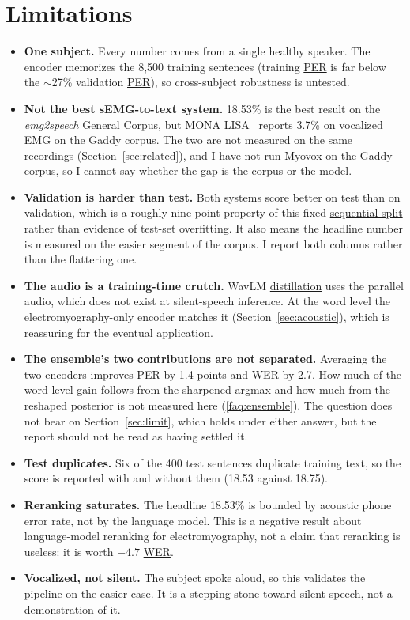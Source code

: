 \documentclass{article}
\DeclareRobustCommand{\glref}[2]{\hyperlink{gl:#1}{\textcolor{glosslink}{#2}}}
\DeclareRobustCommand{\wer}{\glref{wer}{WER}}
\DeclareRobustCommand{\per}{\glref{per}{PER}}
\begin{document}
\section{Limitations}

\begin{itemize}[itemsep=3pt,topsep=4pt]
\item \textbf{One subject.} Every number comes from a single healthy speaker. The encoder memorizes
the 8{,}500 training sentences (training \per{} is far below the $\sim$27\% validation \per{}), so
cross-subject robustness is untested.
\item \textbf{Not the best sEMG-to-text system.} 18.53\% is the best result on the \emph{emg2speech}
General Corpus, but MONA LISA~\citep{benster2024mona} reports 3.7\% on vocalized EMG on the Gaddy
corpus. The two are not measured on the same recordings (Section~\ref{sec:related}), and I have not
run Myovox on the Gaddy corpus, so I cannot say whether the gap is the corpus or the model.
\item \textbf{Validation is harder than test.} Both systems score better on test than on validation,
which is a roughly nine-point property of this fixed \glref{split}{sequential split} rather than
evidence of test-set overfitting. It also means the headline number is measured on the easier segment
of the corpus. I report both columns rather than the flattering one.
\item \textbf{The audio is a training-time crutch.} WavLM \glref{distill}{distillation} uses the
parallel audio, which does not exist at silent-speech inference. At the word level the
electromyography-only encoder matches it (Section~\ref{sec:acoustic}), which is reassuring for the
eventual application.
\item \textbf{The ensemble's two contributions are not separated.} Averaging the two encoders improves
\per{} by 1.4 points and \wer{} by 2.7. How much of the word-level gain follows from the sharpened
argmax and how much from the reshaped posterior is not measured here (\ref{faq:ensemble}). The
question does not bear on Section~\ref{sec:limit}, which holds under either answer, but the report
should not be read as having settled it.
\item \textbf{Test duplicates.} Six of the 400 test sentences duplicate training text, so the score is
reported with and without them (18.53 against 18.75).
\item \textbf{Reranking saturates.} The headline 18.53\% is bounded by acoustic phone error rate, not
by the language model. This is a negative result about language-model reranking for electromyography,
not a claim that reranking is useless: it is worth $-4.7$ \wer{}.
\item \textbf{Vocalized, not silent.} The subject spoke aloud, so this validates the pipeline on the
easier case. It is a stepping stone toward \glref{silent}{silent speech}, not a demonstration of it.
\end{itemize}
\end{document}
